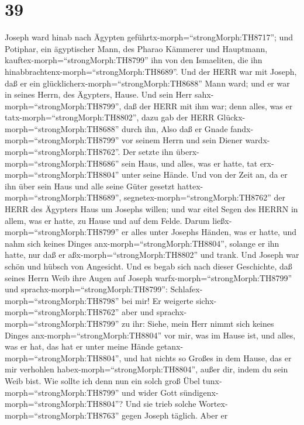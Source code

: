 \hypertarget{section-38}{%
\section{39}\label{section-38}}

 Joseph ward hinab nach Ägypten
geführtx-morph=``strongMorph:TH8717''; und Potiphar, ein ägyptischer
Mann, des Pharao Kämmerer und Hauptmann,
kauftex-morph=``strongMorph:TH8799'' ihn von den Ismaeliten, die ihn
hinabbrachtenx-morph=``strongMorph:TH8689''.  Und der HERR
war mit Joseph, daß er ein glücklicherx-morph=``strongMorph:TH8688''
Mann ward; und er war in seines Herrn, des Ägypters, Hause. 
Und sein Herr sahx-morph=``strongMorph:TH8799'', daß der HERR mit ihm
war; denn alles, was er tatx-morph=``strongMorph:TH8802'', dazu gab der
HERR Glückx-morph=``strongMorph:TH8688'' durch ihn,  Also
daß er Gnade fandx-morph=``strongMorph:TH8799'' vor seinem Herrn und
sein Diener wardx-morph=``strongMorph:TH8762''. Der setzte ihn
überx-morph=``strongMorph:TH8686'' sein Haus, und alles, was er hatte,
tat erx-morph=``strongMorph:TH8804'' unter seine Hände.  Und
von der Zeit an, da er ihn über sein Haus und alle seine Güter gesetzt
hattex-morph=``strongMorph:TH8689'',
segnetex-morph=``strongMorph:TH8762'' der HERR des Ägypters Haus um
Josephs willen; und war eitel Segen des HERRN in allem, was er hatte, zu
Hause und auf dem Felde.  Darum
ließx-morph=``strongMorph:TH8799'' er alles unter Josephs Händen, was er
hatte, und nahm sich keines Dinges anx-morph=``strongMorph:TH8804'',
solange er ihn hatte, nur daß er aßx-morph=``strongMorph:TH8802'' und
trank. Und Joseph war schön und hübsch von Angesicht.  Und
es begab sich nach dieser Geschichte, daß seines Herrn Weib ihre Augen
auf Joseph warfx-morph=``strongMorph:TH8799'' und
sprachx-morph=``strongMorph:TH8799'':
Schlafex-morph=``strongMorph:TH8798'' bei mir!  Er weigerte
sichx-morph=``strongMorph:TH8762'' aber und
sprachx-morph=``strongMorph:TH8799'' zu ihr: Siehe, mein Herr nimmt sich
keines Dinges anx-morph=``strongMorph:TH8804'' vor mir, was im Hause
ist, und alles, was er hat, das hat er unter meine Hände
getanx-morph=``strongMorph:TH8804'',  und hat nichts so
Großes in dem Hause, das er mir verhohlen
habex-morph=``strongMorph:TH8804'', außer dir, indem du sein Weib bist.
Wie sollte ich denn nun ein solch groß Übel
tunx-morph=``strongMorph:TH8799'' und wider Gott
sündigenx-morph=``strongMorph:TH8804''?  Und sie trieb
solche Wortex-morph=``strongMorph:TH8763'' gegen Joseph täglich. Aber er
